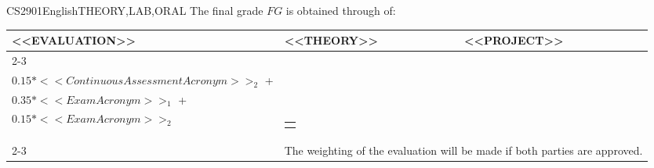   \begin{evaluation}{CS2901}{English}{THEORY,LAB,ORAL}
  The final grade $FG$ is obtained through of:
 
  \begin{tabularx}{0.9\textwidth}{|X|p{}|p{}|} \hline
    \multirow{4}{*}{\uppercase{<<Evaluation>>}} & \uppercase{<<Theory>>} & \uppercase{<<Project>>} \\ \cline{2-3}
    & %
        \begin{minipage}{0.95\textwidth}
        \begin{tabular}{l}
          $0.15*<<ContinuousAssessmentAcronym>>_{1}$ + \\
          $0.15*<<ContinuousAssessmentAcronym>>_{2}$ + \\
          $0.35*<<ExamAcronym>>_{1}$ + \\
          $0.15*<<ExamAcronym>>_{2}$
        \end{tabular} 
        \end{minipage} 
    & %
        \begin{minipage}{0.95\textwidth}
        \begin{tabular}{l}
            $0.2(A + D) + 0.3(Dev) + 0.3(DF)$
            \end{tabular} 
        \end{minipage}                 \\ \cline{2-3}
    
    & \multicolumn{2}{|c|}{The weighting of the evaluation will be made if both parties are approved.}  \\ \hline
    \end{tabularx}
    

\end{evaluation}
